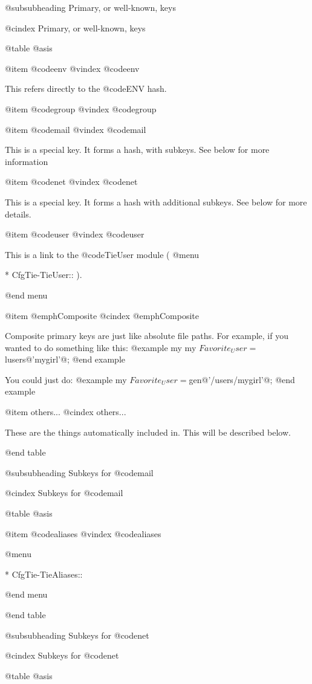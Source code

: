 @subsubheading Primary, or well-known, keys

@cindex Primary, or well-known, keys

@table @asis

@item @code{env}
@vindex @code{env}

This refers directly to the @code{ENV} hash.

@item @code{group}
@vindex @code{group}

@item @code{mail}
@vindex @code{mail}

This is a special key.  It forms a hash, with subkeys.  See below for more
information

@item @code{net}
@vindex @code{net}

This is a special key.  It forms a hash with additional subkeys. See
below for more details.

@item @code{user}
@vindex @code{user}

This is a link to the @code{TieUser} module (
@menu

* CfgTie-TieUser::	
).

@end menu

@item @emph{Composite}
@cindex @emph{Composite}

Composite primary keys are just like absolute file paths.  For example, if
you wanted to do something like this:
@example
        my %
        my $Favorite_User = $lusers@{'mygirl'@};
@end example

You could just do:
@example
        my $Favorite_User = $gen@{'/users/mygirl'@};
@end example

@item others...
@cindex others...

These are the things automatically included in.  This will be described below.

@end table

@subsubheading Subkeys for @code{mail}

@cindex Subkeys for @code{mail}

@table @asis

@item @code{aliases}
@vindex @code{aliases}


@menu

* CfgTie-TieAliases::	
 

@end menu

@end table

@subsubheading Subkeys for @code{net}

@cindex Subkeys for @code{net}

@table @asis

